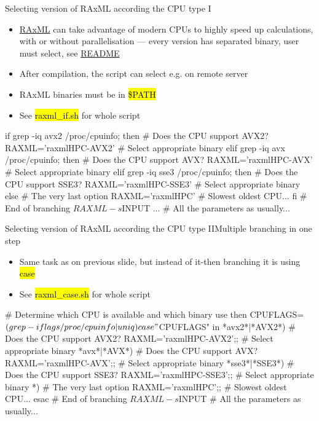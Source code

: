 \documentclass[compress, ucs, xelatex, 11pt, xcolor=svgnames,
  hyperref={
    bookmarks=true,
    unicode=true,
    colorlinks=true,
    pdftitle={Linux, command line and MetaCentrum},
    plainpages=false,
    pdfauthor={Vojtech Zeisek},
    pdfsubject={Course about use of Linux command line, writing shell scripts and using MetaCentrum of CESNET},
    pdfcreator={XeLaTeX},
    pdfkeywords={Linux, GNU, BASH, shell, command line, MetaCentrum},
    linkcolor=DarkRed,
    anchorcolor=DarkBlue,
    citecolor=Indigo,
    filecolor=NavyBlue,
    menucolor=DarkMagenta,
    urlcolor=DarkBlue,
    pdftex},
  url={hyphens, lowtilde} %
  ]{beamer}
\renewcommand{\texttt}[1]{\hl{\ttfamily #1}}
\begin{document}
\begin{frame}[fragile]{Selecting version of RAxML according the CPU type I}
  \begin{itemize}
    \item \href{https://github.com/stamatak/standard-RAxML}{RAxML} can take advantage of modern CPUs to highly speed up calculations, with or without parallelisation --- every version has separated binary, user must select, see \href{https://github.com/stamatak/standard-RAxML/blob/master/README}{README}
    \item After compilation, the script can select e.g. on remote server
    \item RAxML binaries must be in \texttt{\$PATH}
    \item See \texttt{raxml\_if.sh} for whole script
  \end{itemize}
  \begin{bashcode}
    if grep -iq avx2 /proc/cpuinfo; then # Does the CPU support AVX2?
      RAXML='raxmlHPC-AVX2' # Select appropriate binary
      elif grep -iq avx /proc/cpuinfo; then # Does the CPU support AVX?
        RAXML='raxmlHPC-AVX' # Select appropriate binary
        elif grep -iq sse3 /proc/cpuinfo; then # Does the CPU support SSE3?
          RAXML='raxmlHPC-SSE3' # Select appropriate binary
          else # The very last option
            RAXML='raxmlHPC' # Slowest oldest CPU...
      fi # End of branching
    $RAXML -s $INPUT ... # All the parameters as usually...
  \end{bashcode}
\end{frame}

\begin{frame}[fragile]{Selecting version of RAxML according the CPU type II}{Multiple branching in one step}
  \begin{itemize}
    \item Same task as on previous slide, but instead of it-then branching it is using \texttt{case}
    \item See \texttt{raxml\_case.sh} for whole script
  \end{itemize}
  \begin{bashcode}
    # Determine which CPU is available and which binary use then
    CPUFLAGS=$(grep -i flags /proc/cpuinfo | uniq)
    case "$CPUFLAGS" in
      *avx2*|*AVX2*) # Does the CPU support AVX2?
        RAXML='raxmlHPC-AVX2';; # Select appropriate binary
      *avx*|*AVX*) # Does the CPU support AVX?
        RAXML='raxmlHPC-AVX';; # Select appropriate binary
      *sse3*|*SSE3*) # Does the CPU support SSE3?
        RAXML='raxmlHPC-SSE3';; # Select appropriate binary
      *) # The very last option
        RAXML='raxmlHPC';; # Slowest oldest CPU...
      esac # End of branching
    $RAXML -s $INPUT # All the parameters as usually...
  \end{bashcode}
\end{frame}
\end{document}
